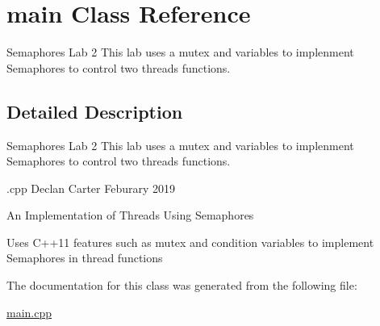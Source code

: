\hypertarget{classmain}{}\section{main Class Reference}
\label{classmain}


Semaphores Lab 2 This lab uses a mutex and variables to implenment Semaphores to control two threads functions.  




\subsection{Detailed Description}
Semaphores Lab 2 This lab uses a mutex and variables to implenment Semaphores to control two threads functions. 

.cpp Declan Carter Feburary 2019

An Implementation of Threads Using Semaphores

Uses C++11 features such as mutex and condition variables to implement Semaphores in thread functions 

The documentation for this class was generated from the following file\+:\begin{DoxyCompactItemize}
\item 
\hyperlink{main_8cpp}{main.\+cpp}\end{DoxyCompactItemize}
